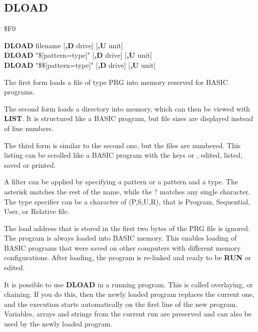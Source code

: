 \subsection{DLOAD}
\begin{description}[leftmargin=2cm,style=nextline]
\item [Token:] \$F0
\item [Format:] {\bf DLOAD} filename [{\bf,D} drive] [{\bf,U} unit] \\
                {\bf DLOAD} "\$[pattern=type]" [{\bf,D} drive] [{\bf,U} unit] \\
                {\bf DLOAD} "\$\$[pattern=type]" [{\bf,D} drive] [{\bf,U} unit]

\item [Usage:] The first form loads a file of type
   PRG into memory reserved for BASIC programs.

The second form loads a directory into memory, which can then be viewed
with {\bf LIST}. It is structured like a BASIC program,
but file sizes are displayed instead of line numbers.

The third form is similar to the second one, but the files are numbered.
This listing can be scrolled like a BASIC program with the keys 
or , edited, listed, saved or printed.

A filter can be applied by specifying a pattern or a pattern and a type.
The asterisk \* matches the rest of the name, while the ? matches any single character.
The type specifier can be a character of (P,S,U,R), that is Program, Sequential, User,
or Relative file.

   \filenamedefinition

   \drivedefinition

   \unitdefinition

\item [Remarks:]
   The load address that is stored in the first two bytes
   of the PRG file is ignored. The program is always loaded into
   BASIC memory. This enables loading of BASIC programs
   that were saved on other computers with different memory
   configurations. After loading, the program is re-linked
   and ready to be {\bf RUN} or edited.

   It is possible to use {\bf DLOAD} in a running program. This is
   called overlaying, or chaining.
   If you do this, then the newly loaded program replaces the current one,
   and the execution starts automatically on the first line of the
   new program. Variables, arrays and strings from the current
   run are preserved and can also be used by the newly loaded program.


\end{description}
